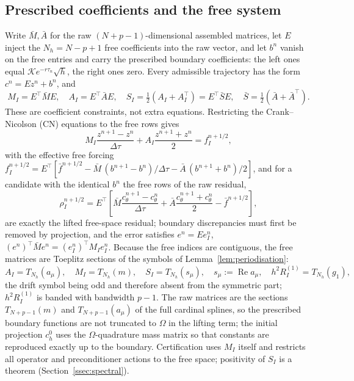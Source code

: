 \documentclass[hidelinks]{siamart251216}
\DeclareMathOperator{\Real}{Re}
\newcommand{\Tn}[2]{T_{#1}(#2)}          %
\newcommand{\sym}[1]{#1}                 %
\begin{document}
\subsection{Prescribed coefficients and the free system}
\label{ssec:constrained-system}
Write $\bar M,\bar A$ for the raw $(N+p-1)$-dimensional assembled matrices, let $E$ inject the
$N_h=N-p+1$ free coefficients into the raw vector, and let $b^n$ vanish on the free entries and
carry the prescribed boundary coefficients: the left ones equal $\mathcal K e^{-r\tau_n}\sqrt h$,
the right ones zero.  Every admissible trajectory has the form $c^n=Ez^n+b^n$, and
\[
 M_I=E^\top\bar M E,\quad A_I=E^\top\bar A E,\quad
 S_I=\tfrac12(A_I+A_I^\top)=E^\top\bar S E,\quad \bar S=\tfrac12(\bar A+\bar A^\top).
\]
These are coefficient constraints, not extra equations.  Restricting the Crank--Nicolson (CN)
equations to the free rows gives
\begin{equation}
 M_I\frac{z^{n+1}-z^n}{\Delta\tau}
 +A_I\frac{z^{n+1}+z^n}{2}=f_I^{n+1/2},
 \label{eq:constrained-cn}
\end{equation}
with the effective free forcing
$f_I^{n+1/2}=E^\top[\bar f^{n+1/2}-\bar M\,(b^{n+1}-b^n)/\Delta\tau-\bar A\,(b^{n+1}+b^n)/2]$,
and for a candidate with the identical $b^n$ the free rows of the raw residual,
\begin{equation}
 \rho_I^{n+1/2}=E^\top\!\left[\bar M\frac{c_\theta^{n+1}-c_\theta^n}{\Delta\tau}
 +\bar A\frac{c_\theta^{n+1}+c_\theta^n}{2}-\bar f^{n+1/2}\right],
 \label{eq:constrained-residual}
\end{equation}
are exactly the lifted free-space residual; boundary discrepancies must first be removed by
projection, and the error satisfies $e^n=Ee_I^n$, $(e^n)^\top\bar M e^n=(e_I^n)^\top M_I e_I^n$.
Because the free indices are contiguous, the free matrices are Toeplitz sections of the
symbols of Lemma~\ref{lem:periodisation}:
\begin{equation}
 A_I=\Tn{N_h}{\sym{a}_\mu},\quad M_I=\Tn{N_h}{\sym{m}},\quad
 S_I=\Tn{N_h}{\sym{s}_\mu},\quad \sym{s}_\mu:=\Real\sym{a}_\mu,\quad
 h^2R^{(1)}_I=\Tn{N_h}{\sym{g}_1},
 \label{eq:sections}
\end{equation}
the drift symbol being odd and therefore absent from the symmetric part; $h^2R^{(1)}_I$ is banded with
bandwidth $p-1$.  The raw matrices are the sections $\Tn{N+p-1}{\sym{m}}$ and $\Tn{N+p-1}{\sym{a}_\mu}$ of the
full cardinal splines, so the prescribed boundary functions are not truncated to $\Omega$ in the
lifting term; the initial projection $c^0_h$ uses the $\Omega$-quadrature mass matrix so that
constants are reproduced exactly up to the boundary.  Certification uses $M_I$ itself and restricts all
operator and preconditioner actions to the free space; positivity of $S_I$ is a theorem
(Section~\ref{ssec:spectral}).
\end{document}
